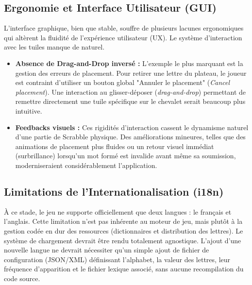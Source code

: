 \documentclass[a4paper]{article}
\begin{document}
	\subsection{Ergonomie et Interface Utilisateur (GUI)}
	L'interface graphique, bien que stable, souffre de plusieurs lacunes ergonomiques qui altèrent la fluidité de l'expérience utilisateur (UX). Le système d'interaction avec les tuiles manque de naturel.
	\begin{itemize}
		\item \textbf{Absence de Drag-and-Drop inversé :} L'exemple le plus marquant est la gestion des erreurs de placement. Pour retirer une lettre du plateau, le joueur est contraint d'utiliser un bouton global "Annuler le placement" (\textit{Cancel placement}). Une interaction au glisser-déposer (\textit{drag-and-drop}) permettant de remettre directement une tuile spécifique sur le chevalet serait beaucoup plus intuitive.
		\item \textbf{Feedbacks visuels :} Ces rigidités d'interaction cassent le dynamisme naturel d'une partie de Scrabble physique. Des améliorations mineures, telles que des animations de placement plus fluides ou un retour visuel immédiat (surbrillance) lorsqu'un mot formé est invalide avant même sa soumission, moderniseraient considérablement l'application.
	\end{itemize}
	
	\subsection{Limitations de l'Internationalisation (i18n)}
	À ce stade, le jeu ne supporte officiellement que deux langues : le français et l'anglais. Cette limitation n'est pas inhérente au moteur de jeu, mais plutôt à la gestion codée en dur des ressources (dictionnaires et distribution des lettres).
	Le système de chargement devrait être rendu totalement agnostique. L'ajout d'une nouvelle langue ne devrait nécessiter qu'un simple ajout de fichier de configuration (JSON/XML) définissant l'alphabet, la valeur des lettres, leur fréquence d'apparition et le fichier lexique associé, sans aucune recompilation du code source.
	
\end{document}
